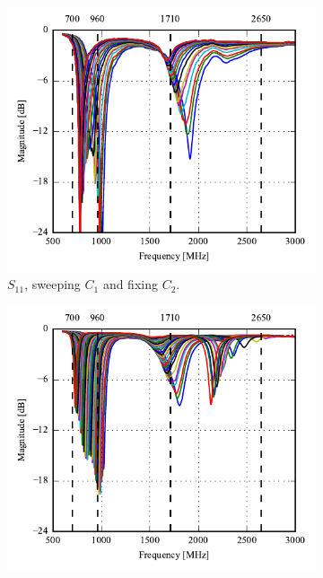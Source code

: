 \begin{figure}[htbp]
   \begin{subfigure}[b]{0.49\linewidth}
        \centering
        \includegraphics{img/tech_sol/monopole/5mm/meas/S11.pdf}
        \caption{$S_{11}$, sweeping $C_1$ and fixing $C_2$.}
    \end{subfigure}
    \hfill
    \begin{subfigure}[b]{0.49\linewidth}
        \centering
        \includegraphics{img/tech_sol/monopole/5mm/meas/S22.pdf}

\end{subfigure}
\end{figure}
